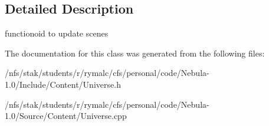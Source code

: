 \subsection{Detailed Description}
functionoid to update scenes 

The documentation for this class was generated from the following files:\begin{DoxyCompactItemize}
\item 
/nfs/stak/students/r/rymalc/cfs/personal/code/Nebula-\/1.0/Include/Content/Universe.h\item 
/nfs/stak/students/r/rymalc/cfs/personal/code/Nebula-\/1.0/Source/Content/Universe.cpp\end{DoxyCompactItemize}

